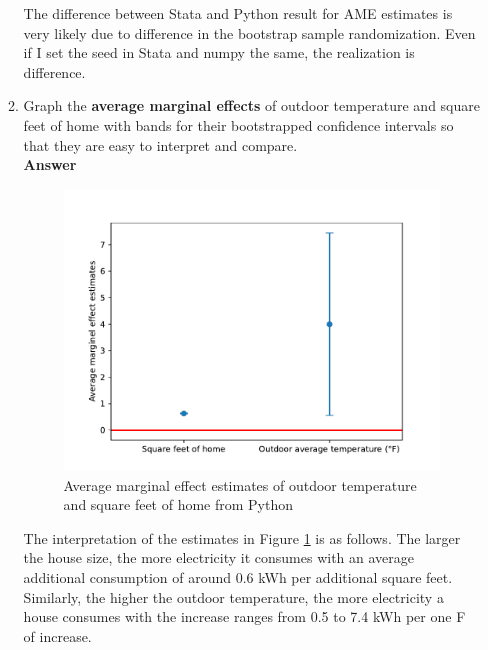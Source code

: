 \documentclass{article}
\begin{document}
\begin{enumerate}
\begin{enumerate}
    The difference between Stata and Python result for AME estimates is very likely due to difference in the bootstrap sample randomization. Even if I set the seed in Stata and numpy the same, the realization is difference.
    \item Graph the \textbf{average marginal effects} of outdoor temperature and square feet of home with bands for their bootstrapped confidence intervals so that they are easy to interpret and compare.
    \\\textbf{Answer}\\
    \begin{figure}[H]
        \centering
        \includegraphics[scale = 0.7]{./figure/ame.pdf}
        \caption{Average marginal effect estimates of outdoor temperature and square feet of home from Python}
        \label{f1:ame}
    \end{figure}
    The interpretation of the estimates in Figure \ref{f1:ame} is as follows. The larger the house size, the more electricity it consumes with an average additional consumption of around 0.6 kWh per additional square feet. Similarly, the higher the outdoor temperature, the more electricity a house consumes with the increase ranges from 0.5 to 7.4 kWh per one \textdegree F of increase.
\end{enumerate}


\end{enumerate}
\end{document}
